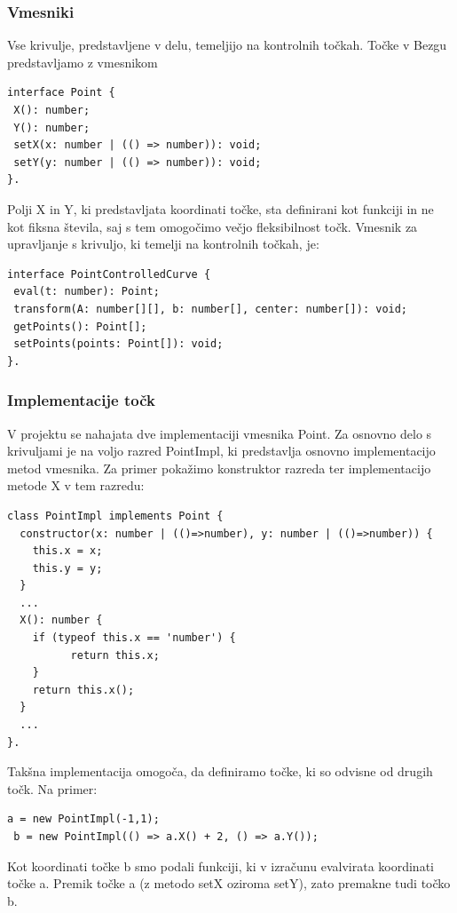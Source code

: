 \documentclass[isrm2, tisk]{fmfdelo}
\begin{document}
    \subsubsection{Vmesniki}\label{subsubsec:osnovni-vmesniki}
    Vse krivulje, predstavljene v delu, temeljijo na kontrolnih točkah.
    Točke v Bezgu predstavljamo z vmesnikom
    \begin{lstlisting}[label={lst:vmesnik-tocke}]
interface Point {
 X(): number;
 Y(): number;
 setX(x: number | (() => number)): void;
 setY(y: number | (() => number)): void;
}.
    \end{lstlisting}
    Polji X in Y, ki predstavljata koordinati točke, sta definirani kot funkciji in ne kot fiksna števila, saj s tem omogočimo večjo fleksibilnost točk.
    Vmesnik za upravljanje s krivuljo, ki temelji na kontrolnih točkah, je:
    \begin{lstlisting}[label={lst:vmesnik-curve}]
interface PointControlledCurve {
 eval(t: number): Point;
 transform(A: number[][], b: number[], center: number[]): void;
 getPoints(): Point[];
 setPoints(points: Point[]): void;
}.
    \end{lstlisting}

    \subsubsection{Implementacije točk}
    V projektu se nahajata dve implementaciji vmesnika Point.
    Za osnovno delo s krivuljami je na voljo razred PointImpl, ki predstavlja osnovno implementacijo metod vmesnika.
    Za primer pokažimo konstruktor razreda ter implementacijo metode X v tem razredu:
    \begin{lstlisting}[label={lst:point-impl}]
class PointImpl implements Point {
  constructor(x: number | (()=>number), y: number | (()=>number)) {
    this.x = x;
    this.y = y;
  }
  ...
  X(): number {
    if (typeof this.x == 'number') {
          return this.x;
    }
    return this.x();
  }
  ...
}.
    \end{lstlisting}
    Takšna implementacija omogoča, da definiramo točke, ki so odvisne od drugih točk.
    Na primer:
    \begin{lstlisting}[label={lst:jsx-point-impl}]
 a = new PointImpl(-1,1);
 b = new PointImpl(() => a.X() + 2, () => a.Y());
    \end{lstlisting}
    Kot koordinati točke b smo podali funkciji, ki v izračunu evalvirata koordinati točke a.
    Premik točke a (z metodo setX oziroma setY), zato premakne tudi točko b.
\end{document}
